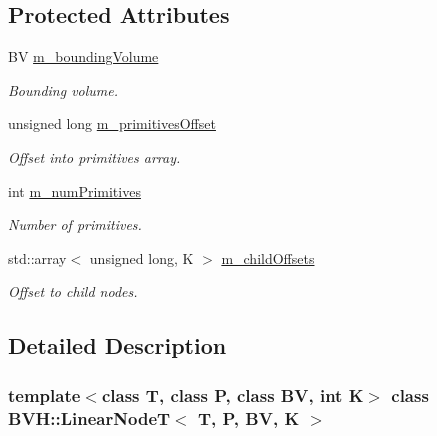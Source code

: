 \subsection*{Protected Attributes}
\begin{DoxyCompactItemize}
\item 
\mbox{\label{classBVH_1_1LinearNodeT_acef96b811ea69cd649fda35da082b361}} 
BV \hyperlink{classBVH_1_1LinearNodeT_acef96b811ea69cd649fda35da082b361}{m\+\_\+bounding\+Volume}
\begin{DoxyCompactList}\small\item\em Bounding volume. \end{DoxyCompactList}\item 
\mbox{\label{classBVH_1_1LinearNodeT_a05efc0076443c7131187adfadaad81ea}} 
unsigned long \hyperlink{classBVH_1_1LinearNodeT_a05efc0076443c7131187adfadaad81ea}{m\+\_\+primitives\+Offset}
\begin{DoxyCompactList}\small\item\em Offset into primitives array. \end{DoxyCompactList}\item 
\mbox{\label{classBVH_1_1LinearNodeT_a59a4aff1eeac58606f4854e334e10a17}} 
int \hyperlink{classBVH_1_1LinearNodeT_a59a4aff1eeac58606f4854e334e10a17}{m\+\_\+num\+Primitives}
\begin{DoxyCompactList}\small\item\em Number of primitives. \end{DoxyCompactList}\item 
\mbox{\label{classBVH_1_1LinearNodeT_a2a160d04d0bea69de7eb949fd9d56dda}} 
std\+::array$<$ unsigned long, K $>$ \hyperlink{classBVH_1_1LinearNodeT_a2a160d04d0bea69de7eb949fd9d56dda}{m\+\_\+child\+Offsets}
\begin{DoxyCompactList}\small\item\em Offset to child nodes. \end{DoxyCompactList}\end{DoxyCompactItemize}


\subsection{Detailed Description}
\subsubsection*{template$<$class T, class P, class BV, int K$>$\newline
class B\+V\+H\+::\+Linear\+Node\+T$<$ T, P, B\+V, K $>$}

